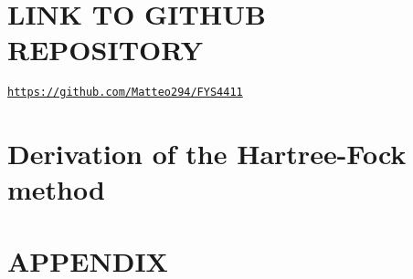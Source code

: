 \documentclass[a4paper, twocolumn]{article}
\begin{document}
\section*{LINK TO GITHUB REPOSITORY}
\centerline{\href{https://github.com/Matteo294/FYS4411}{\texttt{https://github.com/Matteo294/FYS4411}}}

\newpage
\section{Derivation of the Hartree-Fock method}


\clearpage
\section*{APPENDIX}
\appendix

\newpage
\twocolumn[{
\begin{multicols}{2}
\printbibliography
\end{multicols}
}]
\end{document}
